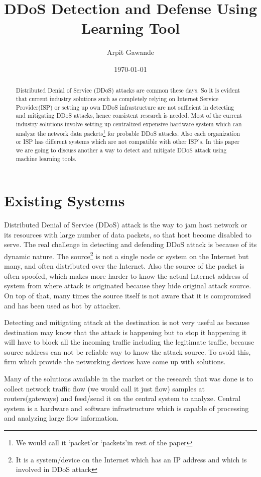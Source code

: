 \documentclass[10pt,oneside,a4paper]{report}
\author{Arpit Gawande}
\title{DDoS Detection and Defense Using Learning Tool}
\date{\today}
\begin{document}
\begin{abstract}
Distributed Denial of Service (DDoS) attacks are common these days\cite{ddosattacknews}. So it is evident that current industry solutions such as completely relying on Internet Service Provider(ISP) or setting up own DDoS infrastructure are not sufficient in detecting and mitigating DDoS attacks, hence consistent research is needed. Most of the current industry solutions involve setting up centralized expensive hardware system which can analyze the network data packets\footnote{We would call it \lq{packet}\rq or \lq{packets}\rq in rest of the paper}\cite{networkdatapacket} for probable DDoS attacks. Also each organization or ISP has different systems which are not compatible with other ISP's. In this paper we are going to discuss another a way to detect and mitigate DDoS attack using machine learning tools.
\end{abstract}

\chapter{Existing Systems}

Distributed Denial of Service (DDoS) attack is the way to jam host network or its resources with large number of data packets, so that host become disabled to serve. The real challenge in detecting and defending DDoS attack is because of its dynamic nature. The source\footnote{It is a system/device on the Internet which has an IP address and which is involved in DDoS attack} is not a single node or system on the Internet but many, and often distributed over the Internet. Also the source of the packet is often spoofed, which makes more harder to know the actual Internet address of system from where attack is originated because they hide original attack source. On top of that, many times the source itself is not aware that it is compromised and has been used as bot\cite{bot} by attacker.

Detecting and mitigating attack at the destination is not very useful as because destination may know that the attack is happening but to stop it happening it will have to block all the incoming traffic including the legitimate traffic, because source address can not be reliable way to know the attack source. To avoid this, firm which provide the networking devices have come up with solutions.

Many of the solutions available in the market or the research that was done is to collect network traffic flow\cite{networkTrafficFlow} (we would call it just flow) samples at routers(gateways) and feed/send it on the central system to analyze. Central system is a hardware and software infrastructure which is capable of processing and analyzing large flow information.
\end{document}

